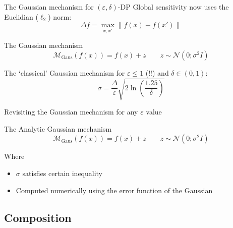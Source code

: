 \documentclass[12pt,aspectratio=169,handout]{beamer}
\begin{document}
\begin{frame}{The Gaussian mechanism for $(\varepsilon, \delta)$-DP}
Global sensitivity now uses the Euclidian ($\ell_2$) norm:
$$
\Delta f = \max_{x, x'} \| f(x) - f(x') \|
$$

\begin{block}{The Gaussian mechanism}
$$
\mathcal{M_{\mathrm{Gaus}}}(f(x)) = f(x) + z \qquad
z \sim \mathcal{N}(0; \sigma^2 I)
$$
\end{block}

The `classical' Gaussian mechanism for $\varepsilon \leq 1$ (!!) and $\delta \in (0, 1)$:
$$
\sigma = \frac{\Delta}{\varepsilon} \sqrt{2 \ln \left( \frac{1.25}{\delta}\right)}
$$


\end{frame}


\begin{frame}{Revisiting the Gaussian mechanism for any $\varepsilon$ value}
	
\begin{block}{The Analytic Gaussian mechanism}
	$$
	\mathcal{M_{\mathrm{Gaus}}}(f(x)) = f(x) + z \qquad
	z \sim \mathcal{N}(0; \sigma^2 I)
	$$
\end{block}

Where
\begin{itemize}
	\item $\sigma$ satisfies certain inequality \citep[Eq.~6]{Balle.Wang.2018.ICML}
	\item Computed numerically using the error function of the Gaussian \citep[Algorithm 1]{Balle.Wang.2018.ICML}
\end{itemize}
	
	
	
\end{frame}

\subsection{Composition}
\end{document}
